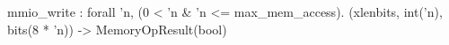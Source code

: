 mmio_write : forall 'n, (0 < 'n & 'n <= max_mem_access). (xlenbits, int('n), bits(8 * 'n)) -> MemoryOpResult(bool)